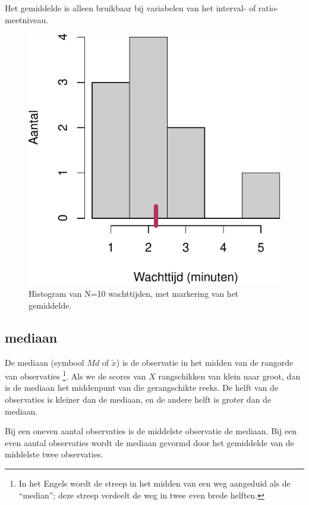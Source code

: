 \documentclass[
]{book}
\begin{document}
Het gemiddelde is alleen bruikbaar bij variabelen van het interval- of
ratio-meetniveau.

\begin{figure}
\centering
\includegraphics{KMS-NL_files/figure-latex/wachttijden-hist-1.pdf}
\caption{\label{fig:wachttijden-hist}Histogram van N=10 wachttijden, met markering van het gemiddelde.}
\end{figure}

\hypertarget{sec:mediaan}{%
\subsection{mediaan}\label{sec:mediaan}}

De mediaan (symbool \(Md\) of \(\tilde{x}\)) is de observatie in het midden
van de rangorde van observaties \footnote{In het Engels wordt de streep in het midden van een weg aangeduid als de ``median''; deze streep verdeelt de weg in twee even brede helften.}. Als we de scores van \(X\)
rangschikken van klein naar groot, dan is de mediaan het middenpunt van
die gerangschikte reeks. De helft van de observaties is kleiner dan de
mediaan, en de andere helft is groter dan de mediaan.

Bij een oneven aantal observaties is de middelste observatie de mediaan.
Bij een even aantal observaties wordt de mediaan gevormd door het
gemiddelde van de middelste twee observaties.
\end{document}
